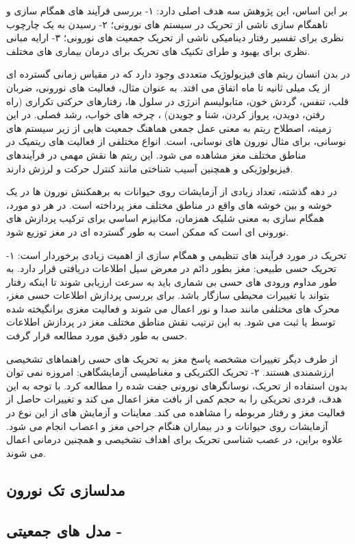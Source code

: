 بر این اساس، این پژوهش سه هدف اصلی دارد: 
۱- بررسی فرآیند های همگام سازی و ناهمگام سازی ناشی از تحریک در سیستم های نورونی؛ ۲- رسیدن به یک چارچوب نظری برای تفسیر رفتار دینامیکی ناشی از تحریک جمعیت های نورونی؛ ۳- ارایه مبانی نظری برای بهبود و طرای تکنیک های تحریک برای درمان بیماری های مختلف.

در بدن انسان ریتم های فیزیولوژیک متعددی وجود دارد که در مقیاس زمانی گسترده ای از یک میلی ثانیه تا ماه اتفاق می افتد. به عنوان مثال، فعالیت های نورونی، ضربان قلب، تنفس، گردش خون، متابولیسم انرژی در سلول ها، رفتارهای حرکتی تکراری (راه رفتن، دویدن، پرواز کردن، شنا و جویدن) ، چرخه های خواب، رشد فصلی. در این زمینه، اصطلاح ریتم به معنی عمل جمعی هماهنگ جمعیت هایی از زیر سیستم های نوسانی، برای مثال نورون های نوسانی، است.
انواع مختلفی از فعالیت های ریتمیک در مناطق مختلف مغز مشاهده می شود. این ریتم ها نقش مهمی در فرآیندهای فیزیولوژیکی و همچنین آسیب شناختی مانند کنترل حرکت و لرزش دارند. 

در دهه گذشته، تعداد زیادی از آزمایشات روی حیوانات به برهمکنش نورون ها در یک خوشه و بین خوشه های واقع در مناطق مختلف مغز پرداخته است. در هر دو مورد، همگام سازی به معنی شلیک همزمان، مکانیزم اساسی برای ترکیب پردازش های نورونی ای است که ممکن است به طور گسترده ای در مغز توزیع شود.

تحریک در مورد فرآیند های تنظیمی و همگام سازی از اهمیت زیادی برخوردار است:
۱- تحریک حسی طبیعی: مغز بطور دائم در معرض سیل اطلاعات دریافتی قرار دارد. به طور مداوم ورودی های حسی بی شماری باید به سرعت ارزیابی شوند تا اینکه رفتار بتواند با تغییرات محیطی سازگار باشد. برای بررسی پردازش اطلاعات حسی مغز، محرک های مختلفی مانند صدا و نور اعمال می شوند و فعالیت مغزی برانگیخته شده توسط 
یا 
ثبت می شود. به این ترتیب نقش مناطق مختلف مغز در پردازش اطلاعات حسی به طور دقیق مورد مطالعه قرار گرفت. 

از طرف دیگر تغییرات مشخصه پاسخ مغز به تحریک های حسی راهنماهای تشخیصی ارزشمندی هستند. 
۲- تحریک الکتریکی و مغناطیسی آزمایشگاهی: امروزه نمی توان بدون استفاده از تحریک، نوسانگرهای نورونی جفت شده را مطالعه کرد. با توجه به این هدف، فردی تحریکی را به حجم کمی از بافت مغز اعمال می کند و تغییرات حاصل از فعالیت مغز و رفتار مربوطه را مشاهده می کند. معاینات و آزمایش های از این نوع در آزمایشات روی حیوانات و در بیماران هنگام جراحی مغز و اعصاب انجام می شود. علاوه براین، در عصب شناسی تحریک برای اهداف تشخیصی و همچنین درمانی اعمال می شوند. 


\subsection{مدلسازی تک نورون}
\subsection{مدل های جمعیتی -}
